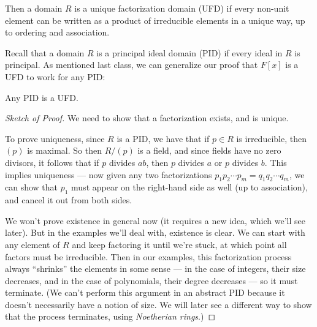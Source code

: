 Then a domain $R$ is a unique factorization domain (UFD) if every non-unit element can be written as a product of irreducible elements in a unique way, up to ordering and association. 



Recall that a domain $R$ is a principal ideal domain (PID) if every ideal in $R$ is principal. As mentioned last class, we can generalize our proof that $F[x]$ is a UFD to work for any PID:

\begin{theorem}
Any PID is a UFD.
\end{theorem}

\begin{proof}[Sketch of Proof]
We need to show that a factorization exists, and is unique. 

To prove uniqueness, since $R$ is a PID, we have that if $p \in R$ is irreducible, then $(p)$ is maximal. So then $R/(p)$ is a field, and since fields have no zero divisors, it follows that if $p$ divides $ab$, then $p$ divides $a$ or $p$ divides $b$. This implies uniqueness --- now given any two factorizations $p_1p_2\cdots p_m = q_1q_2\cdots q_m$, we can show that $p_1$ must appear on the right-hand side as well (up to association), and cancel it out from both sides. 

We won't prove existence in general now (it requires a new idea, which we'll see later). But in the examples we'll deal with, existence is clear. We can start with any element of $R$ and keep factoring it until we're stuck, at which point all factors must be irreducible. Then in our examples, this factorization process always ``shrinks'' the elements in some sense --- in the case of integers, their size decreases, and in the case of polynomials, their degree decreases --- so it must terminate. (We can't perform this argument in an abstract PID because it doesn't necessarily have a notion of size. We will later see a different way to show that the process terminates, using \emph{Noetherian rings}.)%
\end{proof}

